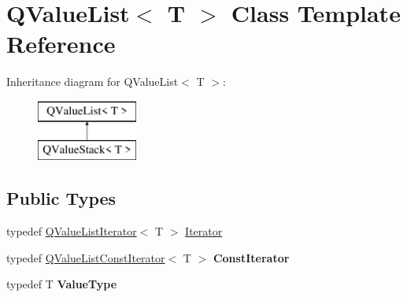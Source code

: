 \hypertarget{class_q_value_list}{}\section{Q\+Value\+List$<$ T $>$ Class Template Reference}
\label{class_q_value_list}
Inheritance diagram for Q\+Value\+List$<$ T $>$\+:\begin{figure}[H]
\begin{center}
\leavevmode
\includegraphics[height=2.000000cm]{class_q_value_list}
\end{center}
\end{figure}
\subsection*{Public Types}
\begin{DoxyCompactItemize}
\item 
typedef \mbox{\hyperlink{class_q_value_list_iterator}{Q\+Value\+List\+Iterator}}$<$ T $>$ \mbox{\hyperlink{class_q_value_list_a043c8661906b45f062d493601804a5ea}{Iterator}}
\item 
\mbox{\label{class_q_value_list_a945cde34d45626792d1c5c8012b9b680}} 
typedef \mbox{\hyperlink{class_q_value_list_const_iterator}{Q\+Value\+List\+Const\+Iterator}}$<$ T $>$ {\bfseries Const\+Iterator}
\item 
\mbox{\label{class_q_value_list_a7113a9ee26d6a196a3e4f35b23a48331}} 
typedef T {\bfseries Value\+Type}
\end{DoxyCompactItemize}
